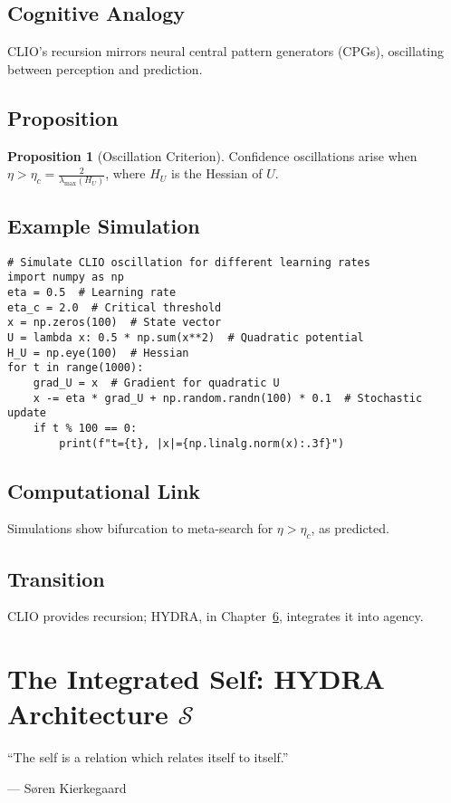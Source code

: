\documentclass[12pt]{book}
\theoremstyle{definition}
\newtheorem{proposition}{Proposition}[chapter]
\begin{document}
\section{Cognitive Analogy}
CLIO’s recursion mirrors neural central pattern generators (CPGs), oscillating between perception and prediction.

\section{Proposition}
\begin{proposition}[Oscillation Criterion]
\label{prop:oscillation}
Confidence oscillations arise when \(\eta > \eta_c = \frac{2}{\lambda_{\max}(H_U)}\), where \(H_U\) is the Hessian of \(U\).
\end{proposition}

\section{Example Simulation}
\begin{lstlisting}[caption={CLIO Oscillation Simulation}, label={lst:clio_code}]
# Simulate CLIO oscillation for different learning rates
import numpy as np
eta = 0.5  # Learning rate
eta_c = 2.0  # Critical threshold
x = np.zeros(100)  # State vector
U = lambda x: 0.5 * np.sum(x**2)  # Quadratic potential
H_U = np.eye(100)  # Hessian
for t in range(1000):
    grad_U = x  # Gradient for quadratic U
    x -= eta * grad_U + np.random.randn(100) * 0.1  # Stochastic update
    if t % 100 == 0:
        print(f"t={t}, |x|={np.linalg.norm(x):.3f}")
\end{lstlisting}

\section{Computational Link}
Simulations show bifurcation to meta-search for \(\eta > \eta_c\), as predicted.

\section{Transition}
CLIO provides recursion; HYDRA, in Chapter~\ref{chap:hydra}, integrates it into agency.

\chapter{The Integrated Self: HYDRA Architecture \texorpdfstring{\(\mathcal{S}\)}{S}}
\label{chap:hydra}
\epigraph{``The self is a relation which relates itself to itself.''}{--- Søren Kierkegaard}
\end{document}
